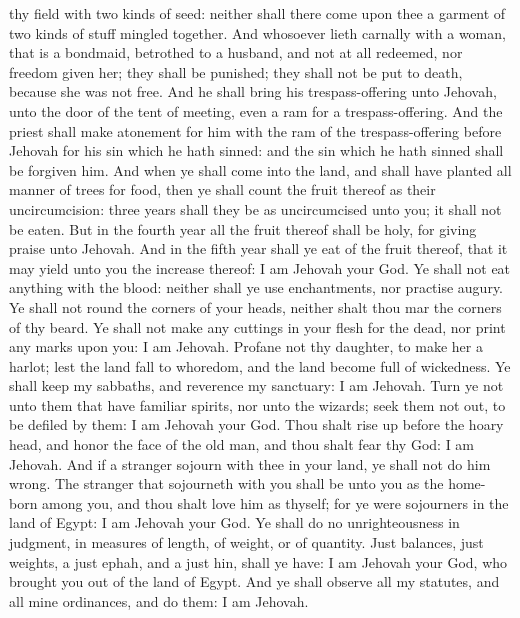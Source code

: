 thy field with two kinds of seed: neither shall there come upon thee a garment of two kinds of stuff mingled together. And whosoever lieth carnally with a woman, that is a bondmaid, betrothed to a husband, and not at all redeemed, nor freedom given her; they shall be punished; they shall not be put to death, because she was not free. And he shall bring his trespass-offering unto Jehovah, unto the door of the tent of meeting, even a ram for a trespass-offering. And the priest shall make atonement for him with the ram of the trespass-offering before Jehovah for his sin which he hath sinned: and the sin which he hath sinned shall be forgiven him.  And when ye shall come into the land, and shall have planted all manner of trees for food, then ye shall count the fruit thereof as their uncircumcision: three years shall they be as uncircumcised unto you; it shall not be eaten. But in the fourth year all the fruit thereof shall be holy, for giving praise unto Jehovah. And in the fifth year shall ye eat of the fruit thereof, that it may yield unto you the increase thereof: I am Jehovah your God.  Ye shall not eat anything with the blood: neither shall ye use enchantments, nor practise augury. Ye shall not round the corners of your heads, neither shalt thou mar the corners of thy beard. Ye shall not make any cuttings in your flesh for the dead, nor print any marks upon you: I am Jehovah.  Profane not thy daughter, to make her a harlot; lest the land fall to whoredom, and the land become full of wickedness. Ye shall keep my sabbaths, and reverence my sanctuary: I am Jehovah.  Turn ye not unto them that have familiar spirits, nor unto the wizards; seek them not out, to be defiled by them: I am Jehovah your God.  Thou shalt rise up before the hoary head, and honor the face of the old man, and thou shalt fear thy God: I am Jehovah.  And if a stranger sojourn with thee in your land, ye shall not do him wrong. The stranger that sojourneth with you shall be unto you as the home-born among you, and thou shalt love him as thyself; for ye were sojourners in the land of Egypt: I am Jehovah your God.  Ye shall do no unrighteousness in judgment, in measures of length, of weight, or of quantity. Just balances, just weights, a just ephah, and a just hin, shall ye have: I am Jehovah your God, who brought you out of the land of Egypt. And ye shall observe all my statutes, and all mine ordinances, and do them: I am Jehovah. 


